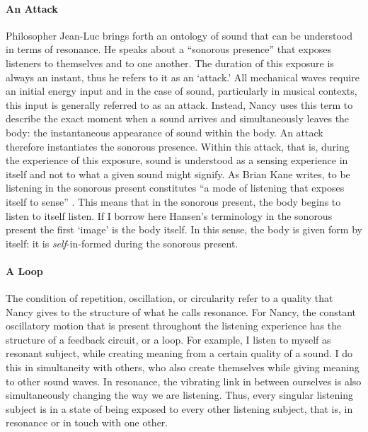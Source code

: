 \paragraph{An Attack}
Philosopher Jean-Luc \textcite{Nan07:Lis} brings forth an ontology of sound that can be understood in terms of resonance. He speaks about a ``sonorous presence'' that exposes listeners to themselves and to one another. The duration of this exposure is always an instant, thus he refers to it as an `attack.' All mechanical waves require an initial energy input and in the case of sound, particularly in musical contexts, this input is generally referred to as an attack. Instead, Nancy uses this term to describe the exact moment when a sound arrives and simultaneously leaves the body: the instantaneous appearance of sound within the body. An attack therefore instantiates the sonorous presence. Within this attack, that is, during the experience of this exposure, sound is understood as a sensing experience in itself and not to what a given sound might signify. As Brian Kane writes, to be listening in the sonorous present constitutes ``a mode of listening that exposes itself to sense'' \parencite[143-144]{Gra15:The}. This means that in the sonorous present, the body begins to listen to itself listen. If I borrow here Hansen's terminology  in the sonorous present the first `image' is the body itself. In this sense, the body is given form by itself: it is \textit{self}-in-formed during the sonorous present.

\paragraph{A Loop}
The condition of repetition, oscillation, or circularity refer to a quality that Nancy gives to the structure of what he calls resonance. For Nancy, the constant oscillatory motion that is present throughout the listening experience has the structure of a feedback circuit, or a loop. For example, I listen to myself as resonant subject, while creating meaning from a certain quality of a sound. I do this in simultaneity with others, who also create themselves while giving meaning to other sound waves. In resonance, the vibrating link in between ourselves is also simultaneously changing the way we are listening. Thus, every singular listening subject is in a state of being exposed to every other listening subject, that is, in resonance or in touch with one other.

